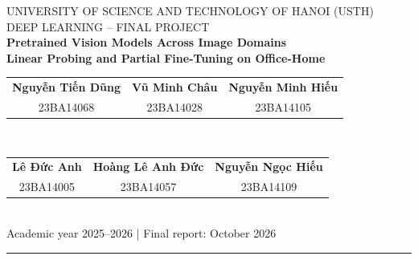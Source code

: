 \documentclass[10pt,a4paper]{article}
\begin{document}
\begin{center}
{\small UNIVERSITY OF SCIENCE AND TECHNOLOGY OF HANOI (USTH)}\\[-1mm]
{\small DEEP LEARNING -- FINAL PROJECT}\\[4mm]
{\LARGE\bfseries Pretrained Vision Models Across Image Domains\\[1mm]
Linear Probing and Partial Fine-Tuning on Office-Home}\\[4mm]
{\small
\begin{tabular}{ccc}
\textbf{Nguyễn Tiến Dũng} & \textbf{Vũ Minh Châu} & \textbf{Nguyễn Minh Hiếu}\\
23BA14068 & 23BA14028 & 23BA14105
\end{tabular}\\[1.5mm]
\begin{tabular}{ccc}
\textbf{Lê Đức Anh} & \textbf{Hoàng Lê Anh Đức} & \textbf{Nguyễn Ngọc Hiếu}\\
23BA14005 & 23BA14057 & 23BA14109
\end{tabular}}\\[3mm]
{\small Academic year 2025--2026 \quad | \quad Final report: October 2026}
\end{center}

\vspace{1mm}
\hrule
\vspace{2mm}

\begin{abstract}
Image classifiers often encounter visual styles that differ from their training data. This project examines how ImageNet-pretrained ResNet18 and ResNet50 transfer from real-world photographs to the Art, Clipart, and Product domains of Office-Home. We compare linear probing with partial fine-tuning of the final residual block under a source-only protocol. After removing 412 byte-identical duplicates, 15,176 images are partitioned into fixed, class-stratified training, validation, and test subsets. Only Real-World training images update model parameters; source-validation macro-F1 selects checkpoints. Four configurations are trained on a Colab Tesla T4 and evaluated on all four domains. ResNet50 linear probing achieves 82.03\% accuracy on Real-World but 37.15\% on Clipart. Partial fine-tuning raises ResNet50 Clipart accuracy to 40.87\%, while reducing accuracy on Art and Product. ResNet18 fine-tuning performs worse than linear probing in every domain. Additional analyses reveal frequent class confusions and increased high-confidence errors after fine-tuning. The findings support stronger pretrained representations but show that source-only fine-tuning does not consistently improve cross-domain reliability. Conclusions are limited to one training seed, one source domain, and fixed held-out partitions.
\end{abstract}
\end{document}
